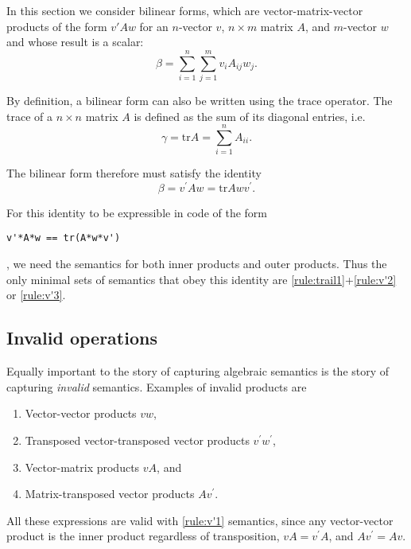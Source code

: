 In this section we consider bilinear forms, which are vector-matrix-vector
products of the form $v'Aw$ for an $n$-vector $v$, $n\times m$ matrix $A$, and
$m$-vector $w$ and whose result is a scalar:
%
\begin{equation}
	\beta = \sum_{i=1}^n \sum_{j=1}^m v_i A_{ij} w_j.\label{eq:v'Aw}
\end{equation}

By definition, a bilinear form can also be written using the trace operator.
The trace of a $n \times n$ matrix $A$ is defined as the sum of its diagonal
entries, i.e.
%
\begin{equation}
	\gamma = \mathrm{tr }A = \sum_{i=1}^n A_{ii}.\label{eq:tr}
\end{equation}

The bilinear form therefore must satisfy the identity
%
\begin{equation}
	\beta = v^\prime Aw = \mathrm{tr }Awv^\prime.\label{eq:trid}
\end{equation}

For this identity to be expressible in code of the form
\begin{lstlisting}
v'*A*w == tr(A*w*v')
\end{lstlisting}
, we need the semantics for both inner products and outer products.
Thus the only minimal sets of semantics that obey this identity are
\ref{rule:trail1}+\ref{rule:v'2} or \ref{rule:v'3}.



\subsection{Invalid operations}

Equally important to the story of capturing algebraic semantics is the story of
capturing \textit{invalid} semantics. Examples of invalid products are

\begin{enumerate}
\item Vector-vector products $vw$,
\item Transposed vector-transposed vector products $v^\prime w^\prime$,
\item Vector-matrix products $vA$, and
\item Matrix-transposed vector products $Av^\prime$.
\end{enumerate}

All these expressions are valid with \ref{rule:v'1} semantics, since any
vector-vector product is the inner product regardless of transposition,
$vA = v^\prime A$, and $Av^\prime = Av$.

